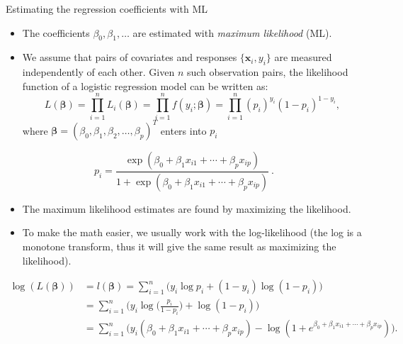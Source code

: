 \documentclass[10pt,ignorenonframetext,]{beamer}
\begin{document}
\begin{frame}

\begin{block}{Estimating the regression coefficients with ML}

\begin{itemize}
\item
  The coefficients \(\beta_0, \beta_1, \ldots\) are estimated with
  \emph{maximum likelihood} (ML).
\item
  We assume that pairs of covariates and responses
  \(\{{\boldsymbol x}_i, y_i\}\) are measured independently of each
  other. Given \(n\) such observation pairs, the likelihood function of
  a logistic regression model can be written as:
  \[L(\boldsymbol{\beta}) = \prod_{i=1}^n L_i(\boldsymbol{\beta}) = \prod_{i=1}^n f(y_i; \boldsymbol{\beta}) = \prod_{i=1}^n (p_i)^{y_i}(1-p_i)^{1-y_i},\]
  where
  \(\boldsymbol{\beta} = (\beta_0, \beta_1, \beta_2, \ldots, \beta_p)^T\)
  enters into \(p_i\)
\end{itemize}

\[p_i= \frac{\exp(\beta_0+\beta_1 x_{i1}+\cdots + \beta_p x_{ip})}{1 + \exp(\beta_0 + \beta_1 x_{i1}+\cdots+\beta_p x_{ip})} \ .\]

\end{block}

\end{frame}

\begin{frame}

\begin{itemize}
\item
  The maximum likelihood estimates are found by maximizing the
  likelihood.
\item
  To make the math easier, we usually work with the log-likelihood (the
  log is a monotone transform, thus it will give the same result as
  maximizing the likelihood).
\end{itemize}

\vspace{-4mm}

\begin{align*} \log(L(\boldsymbol{\beta}))&=l(\boldsymbol{\beta}) =\sum_{i=1}^n \Big ( y_i \log p_i + (1-y_i) \log(1 - p_i )\Big ) \\ &= \sum_{i=1}^n \Big ( y_i \log \Big (\frac{p_i}{1-p_i} \Big) + \log(1-p_i) \Big ) \\
&= \sum_{i=1}^n \Big (y_i (\beta_0 + \beta_1 x_{i1}+\cdots + \beta_p x_{ip}) - \log(1 + e^{\beta_0 + \beta_1 x_{i1}+\cdots + \beta_p x_{ip}} ) \Big ).\end{align*}

\end{frame}
\end{document}
